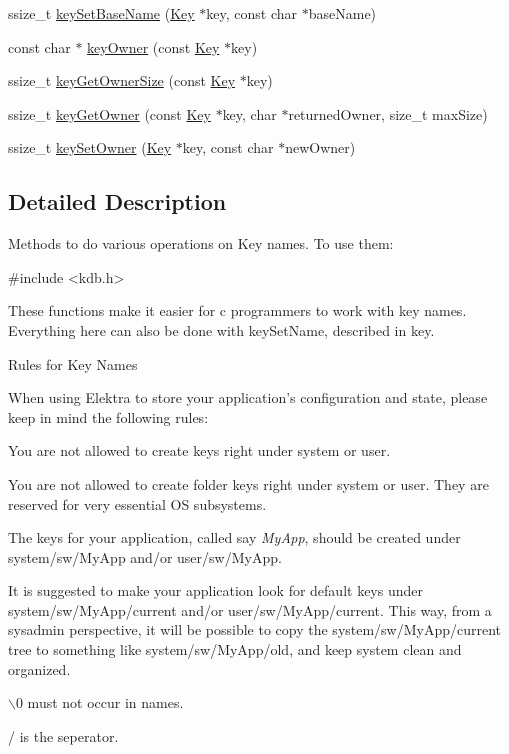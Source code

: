 \begin{DoxyCompactItemize}
\item 
ssize\_\-t \hyperlink{group__keyname_ga6e804bd453f98c28b0ff51430d1df407}{keySetBaseName} (\hyperlink{struct__Key}{Key} $\ast$key, const char $\ast$baseName)
\item 
const char $\ast$ \hyperlink{group__keyname_gaf6485fb8599714b6bbd830cf915ffea5}{keyOwner} (const \hyperlink{struct__Key}{Key} $\ast$key)
\item 
ssize\_\-t \hyperlink{group__keyname_ga4a4561895741ba2ad10acf007c188593}{keyGetOwnerSize} (const \hyperlink{struct__Key}{Key} $\ast$key)
\item 
ssize\_\-t \hyperlink{group__keyname_ga35922a017bee8b4bcb493bbdfad9d6f5}{keyGetOwner} (const \hyperlink{struct__Key}{Key} $\ast$key, char $\ast$returnedOwner, size\_\-t maxSize)
\item 
ssize\_\-t \hyperlink{group__keyname_ga88d6ec200ba0707b7c1b4a88133d2be4}{keySetOwner} (\hyperlink{struct__Key}{Key} $\ast$key, const char $\ast$newOwner)
\end{DoxyCompactItemize}


\subsection{Detailed Description}
Methods to do various operations on Key names. To use them: 
\begin{DoxyCode}
#include <kdb.h>
\end{DoxyCode}


These functions make it easier for c programmers to work with key names. Everything here can also be done with keySetName, described in key.

\begin{DoxyParagraph}{Rules for Key Names}

\end{DoxyParagraph}
When using Elektra to store your application's configuration and state, please keep in mind the following rules:
\begin{DoxyItemize}
\item You are not allowed to create keys right under {\ttfamily system} or {\ttfamily user}.
\item You are not allowed to create folder keys right under {\ttfamily system} or {\ttfamily user}. They are reserved for very essential OS subsystems.
\item The keys for your application, called say {\itshape MyApp\/}, should be created under {\ttfamily system/sw/MyApp} and/or {\ttfamily user/sw/MyApp}.
\item It is suggested to make your application look for default keys under {\ttfamily system/sw/MyApp/current} and/or {\ttfamily user/sw/MyApp/current}. This way, from a sysadmin perspective, it will be possible to copy the {\ttfamily system/sw/MyApp/current} tree to something like {\ttfamily system/sw/MyApp/old}, and keep system clean and organized.
\item $\backslash$0 must not occur in names.
\item / is the seperator. 
\end{DoxyItemize}


